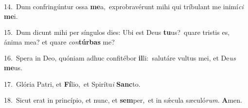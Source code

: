 {\numbfont\textcolor{\numbcolor}{14.}}~Dum confringúntur ossa \textbf{me}\-a,~\star exprobravérunt mihi qui tríbulant me inimí\textit{ci} \textbf{me}\-i.\par
{\numbfont\textcolor{\numbcolor}{15.}}~Dum dicunt mihi per síngulos dies: Ubi est Deus \textbf{tu}\-us?~\star quare tristis es, ánima mea? et quare \textit{con}\-\textbf{túr}\textbf{bas} me?\par
{\numbfont\textcolor{\numbcolor}{16.}}~Spera in Deo, quóniam adhuc confitébor \textbf{il}\-li:~\star salutáre vultus mei, et De\textit{us} \textbf{me}\-us.\par
{\numbfont\textcolor{\numbcolor}{17.}}~Glória Patri, et \textbf{Fí}\-lio,~\star et Spirítu\textit{i} \textbf{Sanc}\-to.\par
{\numbfont\textcolor{\numbcolor}{18.}}~Sicut erat in princípio, et nunc, et \textbf{sem}\-per,~\star et in sǽcula sæculó\-\textit{rum}\-. \textbf{A}\-men.\par
